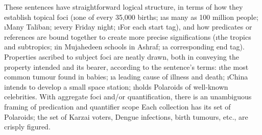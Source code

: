 {These sentences have straightforward logical structure, in terms of 
how they establish topical foci (\i{one of every 35,000 births};
\i{as many as 100 million people};
\i{Many Taliban}; \i{every Friday night}; \i{For each start tag}), 
and how predicates or references are bound together to create more 
precise significations (\i{the tropics and subtropics};
\i{in Mujahedeen schools in Ashraf}; \i{a corresponding end tag}).
Properties ascribed to subject foci are neatly drawn, both in 
conveying the property intended and its bearer, according to 
the sentence's terms: \i{the most common tumour found in babies};
\i{a leading cause of illness and death};
\i{China intends to develop a small space station};
\i{holds Polaroids of well-known celebrities}.  With 
aggregate foci and/or quantification, there is an unambiguous 
framing of predication and quantifier scope {\mdash} Each collection 
has its set of Polaroids; the set of Karzai voters, Dengue infections, 
birth tumours, etc., are crisply figured.}


